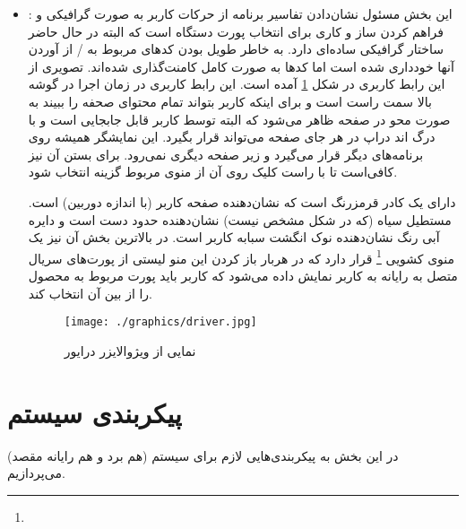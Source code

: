 \documentclass{article}
\begin{document}
\begin{itemize}
تابع \verb~interpret~ به این صورت کار می‌کند که از سیمبل‌هایی که به صورت جهانی در اسکریپت
تعریف شده است آن سمبلی که با
\verb~do_~
آغاز می‌شود و پایانش با نام کانمند ما است (توابع متناسب در فایل تعریف شده‌اند) را انتخاب و پاس دادن پارامترها اجرا کن.

لیست دستوراتی که درایور از آن پشتیبانی می‌کند نیز به صورت زیر است:
\begin{latin}
\begin{lstlisting}[language=python]
# patterns send from RPi
patterns = [
    "^(b)[*]([-]?\d+)[*]([-]?\d+)[*]([-]?\d+)[*]([-]?\d+)$",
    "^(v)[*]([-]?\d+)[*]([-]?\d+)$",
    "^(d)$",
    "^(md)$",
    "^(mu)$",
    "^(c)$",
    "^(r)$",
    "^(s)[*]([-]?\d+)$",
    "^p$"
]
\end{lstlisting}	
\end{latin}
	
	\item {}: این بخش مسئول نشان‌دادن تفاسیر برنامه از حرکات کاربر به صورت گرافیکی و فراهم کردن ساز و کاری برای انتخاب پورت دستگاه است که البته در حال حاضر ساختار گرافیکی ساده‌ای دارد. به خاطر طویل بودن کدهای مربوط به / از آوردن آنها خودداری شده است اما کدها به صورت کامل کامنت‌گذاری شده‌اند. تصویری از این رابط کاربری در شکل \ref{gui}
	آمده است.
	این رابط کاربری در زمان اجرا در گوشه بالا سمت راست است و برای اینکه کاربر بتواند تمام محتوای صحفه را ببیند به صورت محو در صفحه ظاهر می‌شود که البته توسط کاربر قابل جابجایی است و با درگ اند دراپ در هر جای صفحه می‌تواند قرار بگیرد. این نمایشگر همیشه روی برنامه‌های دیگر قرار می‌گیرد و زیر صفحه دیگری نمی‌رود. برای بستن آن نیز کافی‌است تا با راست کلیک روی آن از منوی مربوط گزینه   انتخاب شود.
	
	دارای یک کادر قرمز‌رنگ است که نشان‌دهنده صفحه کاربر (با اندازه دوربین) است. مستطیل سیاه (که در شکل مشخص نیست) نشان‌دهنده حدود دست است و دایره آبی رنگ نشان‌دهنده نوک انگشت سبابه کاربر است. در بالاترین بخش آن نیز یک منوی کشویی \footnote{}
قرار دارد که در هربار باز کردن این منو لیستی از پورت‌های سریال متصل به رایانه به کاربر
نمایش داده می‌شود که کاربر باید پورت مربوط به محصول را از بین آن انتخاب کند.

	\begin{figure}
		\centering
		\texttt{[image: ./graphics/driver.jpg]}
		\caption{نمایی از ویژوالایزر درایور}
		\label{gui}
	\end{figure}
	
\end{itemize}

\section{پیکربندی سیستم}
در این بخش به پیکر‌بندی‌هایی لازم برای سیستم (هم برد و هم رایانه مقصد)‌ می‌پردازیم.
\end{document}
